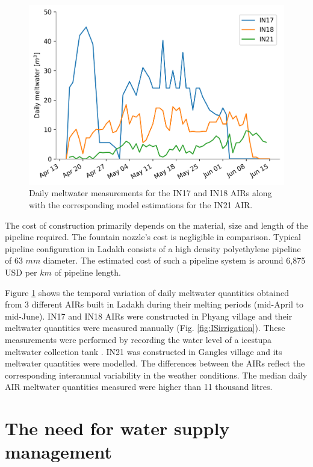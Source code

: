 \begin{figure}[htb]
	\centering
	\includegraphics[width=\textwidth]{figs/melt.png}
	\caption{Daily meltwater measurements for the IN17 and IN18 AIRs along with the corresponding model estimations
		for the IN21 AIR. }
	\label{fig:ISmelt}
\end{figure}

The cost of construction primarily depends on the material, size and length of the pipeline required. The
fountain nozzle's cost is negligible in comparison. Typical pipeline configuration in Ladakh consists of a high
density polyethylene pipeline of 63 $mm$ diameter. The estimated cost of such a pipeline system is around 6,875
USD per $km$ of pipeline length.

Figure \ref{fig:ISmelt} shows the temporal variation of daily meltwater quantities obtained from 3 different
AIRs built in Ladakh during their melting periods (mid-April to mid-June). IN17 and IN18 AIRs were constructed
in Phyang village and their meltwater quantities were measured manually (Fig. \ref{fig:ISirrigation}). These
measurements were performed by recording the water level of a icestupa meltwater collection tank
\citep{vermaIceStupaMeltwater2018}. IN21 was constructed in Gangles village and its meltwater quantities
were modelled. The differences between the AIRs reflect the corresponding interannual variability in the weather
conditions. The median daily AIR meltwater quantities measured were higher than 11 thousand litres.

\section{The need for water supply management}

